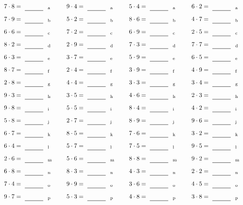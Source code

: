 \documentclass
[
  draft    = true,
  fontsize = 11pt,
  parskip  = half-
]
{scrartcl}
\begin{document}
\par\vfill\par
\begin{align*}
    \pline{7\cdot8}&=\rline{a}
  & \pline{9\cdot4}&=\rline{a}
  & \pline{5\cdot4}&=\rline{a}
  & \pline{6\cdot2}&=\rline{a} \\[1ex]
    \pline{7\cdot9}&=\rline{b}
  & \pline{5\cdot2}&=\rline{b}
  & \pline{8\cdot6}&=\rline{b}
  & \pline{4\cdot7}&=\rline{b} \\[1ex]
    \pline{6\cdot6}&=\rline{c}
  & \pline{7\cdot2}&=\rline{c}
  & \pline{6\cdot9}&=\rline{c}
  & \pline{2\cdot5}&=\rline{c} \\[1ex]
    \pline{8\cdot2}&=\rline{d}
  & \pline{2\cdot9}&=\rline{d}
  & \pline{7\cdot3}&=\rline{d}
  & \pline{7\cdot7}&=\rline{d} \\[1ex]
    \pline{6\cdot3}&=\rline{e}
  & \pline{3\cdot7}&=\rline{e}
  & \pline{5\cdot9}&=\rline{e}
  & \pline{6\cdot5}&=\rline{e} \\[1ex]
    \pline{8\cdot7}&=\rline{f}
  & \pline{2\cdot4}&=\rline{f}
  & \pline{3\cdot9}&=\rline{f}
  & \pline{4\cdot9}&=\rline{f} \\[1ex]
    \pline{2\cdot8}&=\rline{g}
  & \pline{4\cdot4}&=\rline{g}
  & \pline{3\cdot3}&=\rline{g}
  & \pline{3\cdot4}&=\rline{g} \\[1ex]
    \pline{9\cdot3}&=\rline{h}
  & \pline{3\cdot5}&=\rline{h}
  & \pline{4\cdot6}&=\rline{h}
  & \pline{2\cdot3}&=\rline{h} \\[1ex]
    \pline{9\cdot8}&=\rline{i}
  & \pline{5\cdot5}&=\rline{i}
  & \pline{8\cdot4}&=\rline{i}
  & \pline{4\cdot2}&=\rline{i} \\[1ex]
    \pline{5\cdot8}&=\rline{j}
  & \pline{2\cdot7}&=\rline{j}
  & \pline{8\cdot9}&=\rline{j}
  & \pline{9\cdot6}&=\rline{j} \\[1ex]
    \pline{6\cdot7}&=\rline{k}
  & \pline{8\cdot5}&=\rline{k}
  & \pline{7\cdot6}&=\rline{k}
  & \pline{3\cdot2}&=\rline{k} \\[1ex]
    \pline{6\cdot4}&=\rline{l}
  & \pline{5\cdot7}&=\rline{l}
  & \pline{7\cdot5}&=\rline{l}
  & \pline{9\cdot5}&=\rline{l} \\[1ex]
    \pline{2\cdot6}&=\rline{m}
  & \pline{5\cdot6}&=\rline{m}
  & \pline{8\cdot8}&=\rline{m}
  & \pline{9\cdot2}&=\rline{m} \\[1ex]
    \pline{6\cdot8}&=\rline{n}
  & \pline{8\cdot3}&=\rline{n}
  & \pline{4\cdot3}&=\rline{n}
  & \pline{2\cdot2}&=\rline{n} \\[1ex]
    \pline{7\cdot4}&=\rline{o}
  & \pline{9\cdot9}&=\rline{o}
  & \pline{3\cdot6}&=\rline{o}
  & \pline{4\cdot5}&=\rline{o} \\[1ex]
    \pline{9\cdot7}&=\rline{p}
  & \pline{5\cdot3}&=\rline{p}
  & \pline{4\cdot8}&=\rline{p}
  & \pline{3\cdot8}&=\rline{p}
\end{align*}
\end{document}
